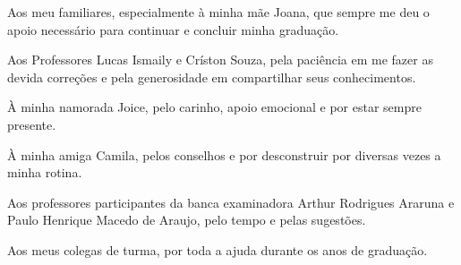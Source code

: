 Aos meu familiares, especialmente à minha mãe Joana, que sempre me deu o apoio necessário para continuar e concluir minha graduação.

Aos Professores Lucas Ismaily e Críston Souza, pela paciência em me fazer as devida correções e pela generosidade em compartilhar seus conhecimentos.

À minha namorada Joice, pelo carinho, apoio emocional e por estar sempre presente.

À minha amiga Camila, pelos conselhos e por desconstruir por diversas vezes a minha rotina.

Aos professores participantes da banca examinadora Arthur Rodrigues Araruna e Paulo Henrique Macedo de Araujo, pelo tempo e pelas sugestões.

Aos meus colegas de turma, por toda a ajuda durante os anos de graduação.

